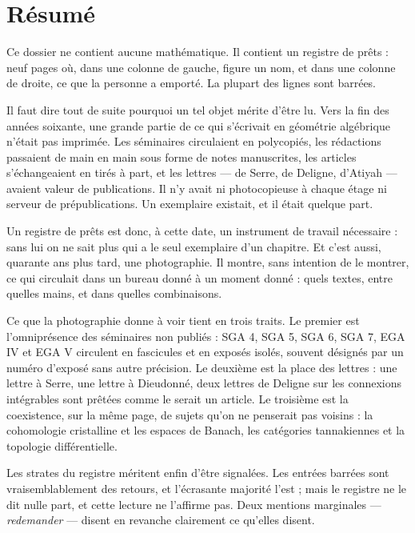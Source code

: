 \documentclass[11pt,a4paper]{article}
\begin{document}
\section*{Résumé}

\begin{resume}
Ce dossier ne contient aucune mathématique. Il contient un registre de prêts :
neuf pages où, dans une colonne de gauche, figure un nom, et dans une colonne de
droite, ce que la personne a emporté. La plupart des lignes sont barrées.

Il faut dire tout de suite pourquoi un tel objet mérite d'être lu. Vers la fin
des années soixante, une grande partie de ce qui s'écrivait en géométrie
algébrique n'était pas imprimée. Les séminaires circulaient en polycopiés, les
rédactions passaient de main en main sous forme de notes manuscrites, les
articles s'échangeaient en tirés à part, et les lettres --- de Serre, de
Deligne, d'Atiyah --- avaient valeur de publications. Il n'y avait ni
photocopieuse à chaque étage ni serveur de prépublications. Un exemplaire
existait, et il était quelque part.

Un registre de prêts est donc, à cette date, un instrument de travail
nécessaire : sans lui on ne sait plus qui a le seul exemplaire d'un chapitre. Et
c'est aussi, quarante ans plus tard, une photographie. Il montre, sans intention
de le montrer, ce qui circulait dans un bureau donné à un moment donné : quels
textes, entre quelles mains, et dans quelles combinaisons.

Ce que la photographie donne à voir tient en trois traits. Le premier est
l'omniprésence des séminaires non publiés : SGA 4, SGA 5, SGA 6, SGA 7, EGA IV et
EGA V circulent en fascicules et en exposés isolés, souvent désignés par un
numéro d'exposé sans autre précision. Le deuxième est la place des lettres :
une lettre à Serre, une lettre à Dieudonné, deux lettres de Deligne sur les
connexions intégrables sont prêtées comme le serait un article. Le troisième est
la coexistence, sur la même page, de sujets qu'on ne penserait pas voisins : la
cohomologie cristalline et les espaces de Banach, les catégories tannakiennes et
la topologie différentielle.

Les strates du registre méritent enfin d'être signalées. Les entrées barrées
sont vraisemblablement des retours, et l'écrasante majorité l'est ; mais le
registre ne le dit nulle part, et cette lecture ne l'affirme pas. Deux mentions
marginales --- \emph{redemander} --- disent en revanche clairement ce qu'elles
disent.

\end{resume}
\end{document}
